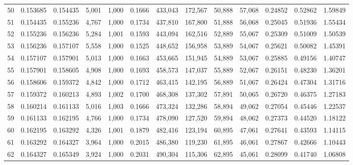 \begin{tabular}{rrrrrrrrrrrrr}
50  &  0.153685 &  0.154435 &   5,001 &  1,000 &                                     0.1666 &  433,043 &  172,567 &   50,888 &   57,068 &  0.24852 &  0.52862 &  1.59849 \\
51  &  0.154435 &  0.155236 &   4,767 &  1,000 &                                     0.1734 &  437,810 &  167,800 &   51,888 &   56,068 &  0.25045 &  0.51936 &  1.55434 \\
52  &  0.155236 &  0.156236 &   5,284 &  1,001 &                                     0.1593 &  443,094 &  162,516 &   52,889 &   55,067 &  0.25309 &  0.51009 &  1.50539 \\
53  &  0.156236 &  0.157107 &   5,558 &  1,000 &                                     0.1525 &  448,652 &  156,958 &   53,889 &   54,067 &  0.25621 &  0.50082 &  1.45391 \\
54  &  0.157107 &  0.157901 &   5,013 &  1,000 &                                     0.1663 &  453,665 &  151,945 &   54,889 &   53,067 &  0.25885 &  0.49156 &  1.40747 \\
55  &  0.157901 &  0.158605 &   4,908 &  1,000 &                                     0.1693 &  458,573 &  147,037 &   55,889 &   52,067 &  0.26151 &  0.48230 &  1.36201 \\
56  &  0.158606 &  0.159372 &   4,842 &  1,000 &                                     0.1712 &  463,415 &  142,195 &   56,889 &   51,067 &  0.26424 &  0.47304 &  1.31716 \\
57  &  0.159372 &  0.160213 &   4,893 &  1,002 &                                     0.1700 &  468,308 &  137,302 &   57,891 &   50,065 &  0.26720 &  0.46375 &  1.27183 \\
58  &  0.160214 &  0.161133 &   5,016 &  1,003 &                                     0.1666 &  473,324 &  132,286 &   58,894 &   49,062 &  0.27054 &  0.45446 &  1.22537 \\
59  &  0.161133 &  0.162195 &   4,766 &  1,000 &                                     0.1734 &  478,090 &  127,520 &   59,894 &   48,062 &  0.27373 &  0.44520 &  1.18122 \\
60  &  0.162195 &  0.163292 &   4,326 &  1,001 &                                     0.1879 &  482,416 &  123,194 &   60,895 &   47,061 &  0.27641 &  0.43593 &  1.14115 \\
61  &  0.163292 &  0.164327 &   3,964 &  1,000 &                                     0.2015 &  486,380 &  119,230 &   61,895 &   46,061 &  0.27867 &  0.42666 &  1.10443 \\
62  &  0.164327 &  0.165349 &   3,924 &  1,000 &                                     0.2031 &  490,304 &  115,306 &   62,895 &   45,061 &  0.28099 &  0.41740 &  1.06808 \\

\end{tabular}
